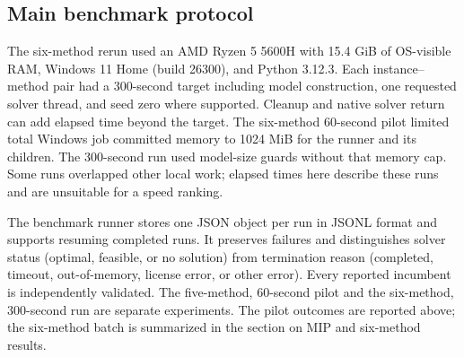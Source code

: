 \subsection{Main benchmark protocol}
The six-method rerun used an AMD Ryzen 5 5600H with 15.4 GiB of
OS-visible RAM, Windows 11 Home (build 26300), and Python 3.12.3.
Each instance--method pair had a 300-second target including model construction,
one requested solver thread, and seed zero where supported. Cleanup and
native solver return can add elapsed time beyond the target. The six-method
60-second pilot limited total Windows job committed memory to 1024 MiB
for the runner and its children. The 300-second run used model-size guards
without that memory cap. Some runs overlapped other local work; elapsed
times here describe these runs and are unsuitable for a speed ranking.

The benchmark runner stores one JSON object per run in JSONL format and
supports resuming completed runs. It preserves failures and distinguishes
solver status (optimal, feasible, or no solution) from termination reason
(completed, timeout, out-of-memory, license error, or other error). Every
reported incumbent is independently validated. The five-method, 60-second pilot and the six-method, 300-second run are
separate experiments. The pilot outcomes are reported above; the six-method
batch is summarized in the section on MIP and six-method results.
